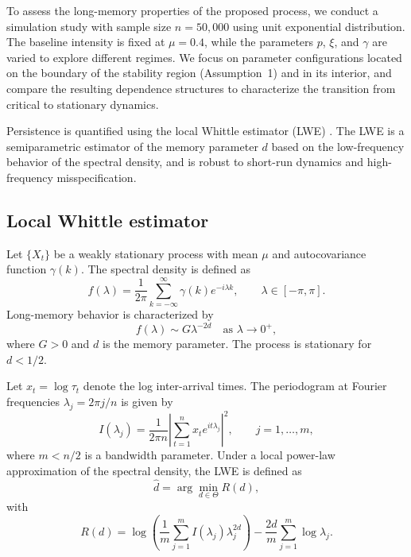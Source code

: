 \documentclass[11pt]{article}
\theoremstyle{definition}
\begin{document}
To assess the long-memory properties of the proposed process, 
we conduct a simulation study with sample size $n=50{,}000$ using unit exponential distribution.
The baseline intensity is fixed at $\mu=0.4$, while the parameters $p$, $\xi$, and $\gamma$ are varied to explore different regimes.
We focus on parameter configurations located on the boundary of the stability region (Assumption~1) and in its interior, and compare the resulting dependence structures to characterize the transition from critical to stationary dynamics.
	

Persistence is quantified using the local Whittle estimator (LWE) \citep{robinson1995gaussian}.
The LWE is a semiparametric estimator of the memory parameter $d$ based on the low-frequency behavior of the spectral density, and is robust to short-run dynamics and high-frequency misspecification.


\subsection{Local Whittle estimator}

Let $\{X_t\}$ be a weakly stationary process with mean $\mu$ and autocovariance function $\gamma(k)$.
The spectral density is defined as
\begin{equation}
	f(\lambda) = \frac{1}{2\pi} \sum_{k=-\infty}^{\infty} \gamma(k) e^{-i\lambda k}, \qquad \lambda \in [-\pi,\pi].
\end{equation}
Long-memory behavior is characterized by
\begin{equation}
	f(\lambda) \sim G \lambda^{-2d} \quad \text{as } \lambda \to 0^+,
\end{equation}
where $G>0$ and $d$ is the memory parameter.
The process is stationary for $d<1/2$.

Let $x_t=\log\tau_t$ denote the log inter-arrival times.
The periodogram at Fourier frequencies $\lambda_j=2\pi j/n$ is given by
\begin{equation}
	I(\lambda_j)=\frac{1}{2\pi n}\left|\sum_{t=1}^{n}x_t e^{it\lambda_j}\right|^2,
	\qquad j=1,\dots,m,
\end{equation}
where $m<n/2$ is a bandwidth parameter.
Under a local power-law approximation of the spectral density, the LWE is defined as
\begin{equation}
	\hat d=\arg\min_{d\in\Theta} R(d),
\end{equation}
with
\begin{equation}
	R(d)=\log\!\left(\frac{1}{m}\sum_{j=1}^{m}I(\lambda_j)\lambda_j^{2d}\right)
	-\frac{2d}{m}\sum_{j=1}^{m}\log\lambda_j.
\end{equation}
\end{document}

